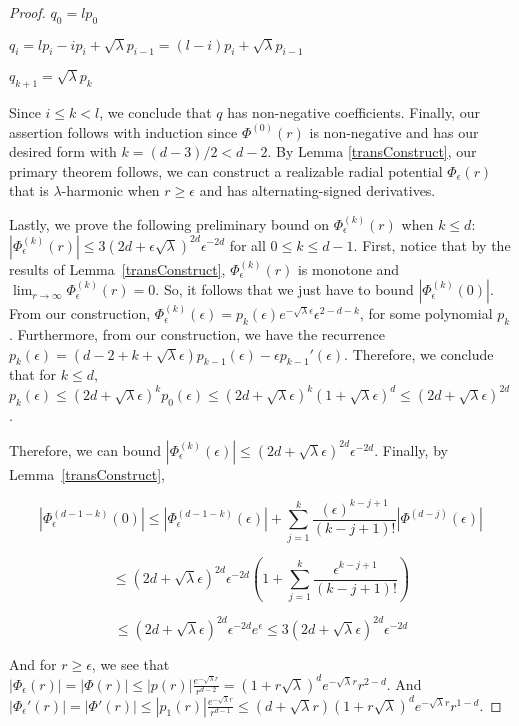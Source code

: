 \begin{proof}
$q_0 = l p_0$

$q_i = lp_i - ip_i + \sqrt{\lambda}p_{i-1} = (l-i)p_i + \sqrt{\lambda}p_{i-1}$ 

$q_{k+1} = \sqrt{\lambda} p_k$

Since $i \leq k < l$, we conclude that $q$ has non-negative coefficients. Finally, our assertion follows with induction since $\Phi^{(0)}(r)$ is non-negative and has our desired form with $k = (d-3)/2 < d-2$. By Lemma \ref{transConstruct}, our primary theorem follows, we can construct a realizable radial potential $\Phi_\epsilon(r)$ that is $\lambda$-harmonic when $r \geq \epsilon$ and has alternating-signed derivatives.

Lastly, we prove the following preliminary bound on $\Phi_\epsilon^{(k)}(r)$ when $k \leq d$: $|\Phi_\epsilon^{(k)}(r)| \leq 3(2d + \epsilon \sqrt{\lambda})^{2d}\epsilon^{-2d}  $ for all $0 \leq k \leq d-1$. First, notice that by the results of Lemma~\ref{transConstruct}, $\Phi_\epsilon^{(k)}(r)$ is monotone and $\lim_{r\to\infty}\Phi_\epsilon^{(k)}(r) = 0$. So, it follows that we just have to bound $|\Phi_{\epsilon}^{(k)}(0)|$. From our construction, $\Phi_{\epsilon}^{(k)}(\epsilon) = p_k(\epsilon)e^{-\sqrt{\lambda}\epsilon}\epsilon^{2-d-k}$, for some polynomial $p_k$. Furthermore, from our construction, we have the recurrence $p_{k}(\epsilon) = (d-2+k + \sqrt{\lambda}\epsilon)p_{k-1}(\epsilon) - \epsilon p_{k-1}'(\epsilon)$. Therefore, we conclude that for $k \leq d$, $p_k(\epsilon) \leq (2d + \sqrt{\lambda} \epsilon)^kp_0(\epsilon) \leq  (2d + \sqrt{\lambda} \epsilon)^k(1+\sqrt{\lambda}\epsilon)^d \leq (2d + \sqrt{\lambda}\epsilon)^{2d}$. 

Therefore, we can bound $|\Phi_\epsilon^{(k)}(\epsilon)| \leq (2d + \sqrt{\lambda}\epsilon)^{2d}\epsilon^{-2d}$. Finally, by Lemma~\ref{transConstruct}, 

\[|\Phi_{\epsilon}^{(d-1-k)}(0)| \leq |\Phi_{\epsilon}^{(d-1-k)}(\epsilon)| + \sum_{j=1}^k \frac{(\epsilon )^{k-j+1}}{(k-j+1)!} |\Phi^{(d-j)}(\epsilon)|\]

\[ \leq (2d + \sqrt{\lambda}\epsilon)^{2d}\epsilon^{-2d} (1 + \sum_{j=1}^k \frac{\epsilon^{k-j+1}}{(k-j+1)!})\]

\[ \leq (2d + \sqrt{\lambda}\epsilon)^{2d}\epsilon^{-2d} e^{\epsilon} \leq 3(2d + \sqrt{\lambda}\epsilon)^{2d}\epsilon^{-2d}\]

And for $r \geq \epsilon$, we see that $|\Phi_\epsilon(r)| = |\Phi(r)| \leq |p(r)|\frac{e^{-\sqrt{\lambda}r}}{r^{d-2}} = (1+r\sqrt{\lambda})^de^{-\sqrt{\lambda}r}r^{2-d}$. And $|\Phi_\epsilon'(r)| = |\Phi'(r)| \leq |p_1(r)| \frac{e^{-\sqrt{\lambda} r}}{r^{d-1}} \leq (d+\sqrt{\lambda}r)(1+ r\sqrt{\lambda})^de^{-\sqrt{\lambda} r} r^{1-d}$.



\end{proof}
